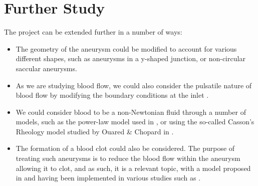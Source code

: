 \documentclass[a4paper, 11pt]{report}
\begin{document}
\section{Further Study}
The project can be extended further in a number of ways:
\begin{itemize}
    \item The geometry of the aneurysm could be modified to account for various different shapes, such as aneurysms in a y-shaped junction, or non-circular saccular aneurysms. 
    \item As we are studying blood flow, we could also consider the pulsatile nature of blood flow by modifying the boundary conditions at the inlet \cite{artoli2002}.
    \item We could consider blood to be a non-Newtonian fluid through a number of models, such as the power-law model used in \cite{AFROUZI2020}, or using the so-called Casson's Rheology model studied by Ouared \& Chopard in \cite{ouared+chopard}.
    \item The formation of a blood clot could also be considered. The purpose of treating such aneurysms is to reduce the blood flow within the aneurysm allowing it to clot, and as such, it is a relevant topic, with a model proposed in \cite{ouared+chopard} and having been implemented in various studies such as \cite{thrombosislb}.
\end{itemize}



\appendix
\end{document}
